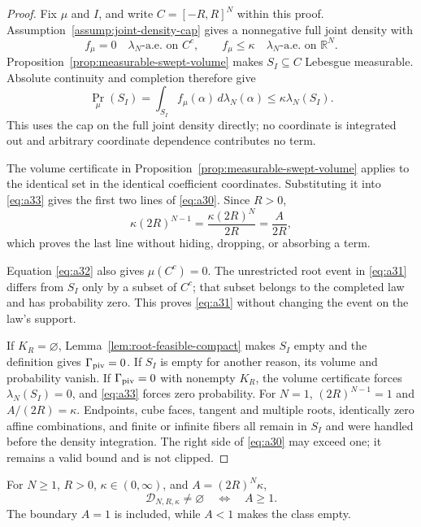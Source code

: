 \begin{proof}
Fix $\mu$ and $I$, and write $C=[-R,R]^N$ within this proof.
Assumption~\ref{assump:joint-density-cap} gives a nonnegative full joint
density with
\[
f_\mu=0\quad\lambda_N\text{-a.e. on }C^c,
\qquad
f_\mu\leq\kappa\quad\lambda_N\text{-a.e. on }\mathbb R^N.
\tag{A32}\label{eq:a32}
\]
Proposition~\ref{prop:measurable-swept-volume} makes $S_I\subseteq C$
Lebesgue measurable.  Absolute continuity and completion therefore give
\[
\Pr_\mu(S_I)
=\int_{S_I}f_\mu(\alpha)\,d\lambda_N(\alpha)
\leq\kappa\lambda_N(S_I).
\tag{A33}\label{eq:a33}
\]
This uses the cap on the full joint density directly; no coordinate is
integrated out and arbitrary coordinate dependence contributes no term.

The volume certificate in Proposition~\ref{prop:measurable-swept-volume}
applies to the identical set in the identical coefficient coordinates.
Substituting it into \eqref{eq:a33} gives the first two lines of
\eqref{eq:a30}.  Since $R>0$,
\[
\kappa(2R)^{N-1}
=\frac{\kappa(2R)^N}{2R}
=\frac A{2R},
\tag{A34}\label{eq:a34}
\]
which proves the last line without hiding, dropping, or absorbing a term.

Equation \eqref{eq:a32} also gives $\mu(C^c)=0$.  The unrestricted root
event in \eqref{eq:a31} differs from $S_I$ only by a subset of $C^c$; that
subset belongs to the completed law and has probability zero.  This proves
\eqref{eq:a31} without changing the event on the law's support.

If $K_R=\varnothing$, Lemma~\ref{lem:root-feasible-compact} makes $S_I$
empty and the definition gives $\Gamma_{\rm piv}=0$.  If $S_I$ is empty
for another reason, its volume and probability vanish.  If
$\Gamma_{\rm piv}=0$ with nonempty $K_R$, the volume certificate forces
$\lambda_N(S_I)=0$, and \eqref{eq:a33} forces zero probability.  For
$N=1$, $(2R)^{N-1}=1$ and $A/(2R)=\kappa$.  Endpoints, cube faces,
tangent and multiple roots, identically zero affine combinations, and
finite or infinite fibers all remain in $S_I$ and were handled before the
density integration.  The right side of \eqref{eq:a30} may exceed one; it
remains a valid bound and is not clipped.
\end{proof}

\begin{lemma}
\label{lem:law-class-nonempty}
For $N\geq1$, $R>0$, $\kappa\in(0,\infty)$, and
$A=(2R)^N\kappa$,
\[
\mathcal D_{N,R,\kappa}\neq\varnothing
\quad\Longleftrightarrow\quad A\geq1.
\tag{A35}\label{eq:a35}
\]
The boundary $A=1$ is included, while $A<1$ makes the class empty.
\end{lemma}

